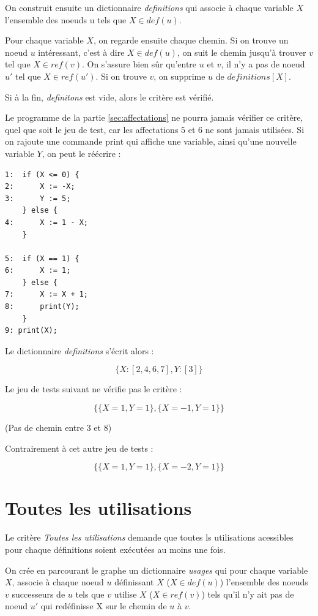On construit ensuite un dictionnaire \textit{definitions} qui associe à chaque variable $X$ l'ensemble des noeuds u tels que $X \in def(u)$.

Pour chaque variable $X$, on regarde ensuite chaque chemin. Si on trouve un noeud $u$ intéressant, c'est à dire $X \in def(u)$, on suit le chemin jusqu'à trouver $v$ tel que $X \in ref(v)$. On s'assure bien sûr qu'entre $u$ et $v$, il n'y a pas de noeud $u'$ tel que $X \in ref(u')$. Si on trouve $v$, on supprime $u$ de $\textit{definitions}[X]$.

Si à la fin, \textit{definitons} est vide, alors le critère est vérifié.

Le programme de la partie \ref{sec:affectations} ne pourra jamais vérifier ce critère, quel que soit le jeu de test, car les affectations $5$ et $6$ ne sont jamais utilisées. Si on rajoute une commande print qui affiche une variable, ainsi qu'une nouvelle variable $Y$, on peut le réécrire :


\begin{verbatim}
1:  if (X <= 0) {
2:      X := -X;
3:		Y := 5;
    } else {
4:      X := 1 - X;
    }

5:  if (X == 1) {
6:      X := 1;
    } else {
7:      X := X + 1;
8:		print(Y);
    }
9: print(X);
\end{verbatim}

Le dictionnaire \textit{definitions} s'écrit alors :

\[ \{
	X : [2, 4, 6, 7],
	Y : [3]
\} \]

Le jeu de tests suivant ne vérifie pas le critère :

\[ \{
	\{ X=1, Y=1\},
	\{ X=-1, Y=1 \}
\} \]

(Pas de chemin entre 3 et 8)


Contrairement à cet autre jeu de tests :

\[ \{
	\{ X=1, Y=1\},
	\{ X=-2, Y=1 \}
\} \]

\section{Toutes les utilisations}

Le critère \textit{Toutes les utilisations} demande que toutes ls utilisations acessibles pour chaque définitions soient exécutées au moins une fois.

On crée en parcourant le graphe un dictionnaire \textit{usages} qui pour chaque variable $X$, associe à chaque noeud $u$ définissant $X$ ($X \in def(u)$) l'ensemble des noeuds $v$ successeurs de $u$ tels que $v$ utilise $X$ ($X \in ref(v)$) tels qu'il n'y ait pas de noeud $u'$ qui redéfinisse X sur le chemin de $u$ à $v$.

